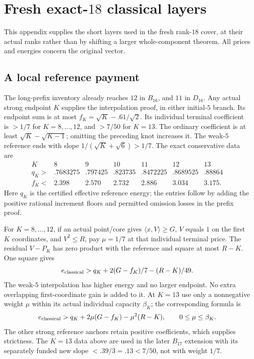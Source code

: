 \documentclass[11pt]{article}
\theoremstyle{definition}
\theoremstyle{remark}
\newcommand{\ip}[2]{\langle #1,#2\rangle}
\begin{document}
\section[Fresh exact-18 classical layers]{Fresh exact-\(18\) classical layers}
\label{app:exact18layers}
This appendix supplies the short layers used in the
fresh rank-\(18\) cover, at their actual ranks rather
than by shifting a larger whole-component theorem.
All prices and energies concern the original vector.

\subsection{A local reference payment}
The long-prefix inventory already reaches \(12\)
in \(B_{16}\), and \(11\) in \(D_{16}\).
Any actual strong endpoint \(K\) supplies the
interpolation proof, in either initial-\(5\) branch.
Its endpoint sum is at most
\(f_K=\sqrt K-.61/\sqrt2\).
Its individual terminal coefficient is \(>1/7\)
for \(K=8,\ldots,12\), and \(>7/50\) for \(K=13\).
The ordinary coefficient is at least
\(\sqrt K-\sqrt{K-1}\); omitting the preceding
knot increases it. The weak-\(5\) reference
ends with slope \(1/(\sqrt K+\sqrt6)>1/7\).
The exact conservative data are
\[
\begin{array}{c|rrrrrr}
K&8&9&10&11&12&13\\ \hline
q_K>&.7683275&.797425&.823735&.8472225&.8689525&.88864\\
f_K<&2.398&2.570&2.732&2.886&3.034&3.175.
\end{array}
\]
Here \(q_K\) is the certified effective reference
energy; the entries follow by adding the positive
rational increment floors and permitted omission
losses in the prefix proof.

For \(K=8,\ldots,12\), if an actual point/core gives
\(\ip{x}{V}\geq G\),
\(V\) equals \(1\) on the first \(K\) coordinates,
and \(V^2\leq R\), pay \(\mu=1/7\) at that
individual terminal price. The residual \(V-P_K\)
has zero product with the reference and square
at most \(R-K\). One square gives
\begin{equation}\label{app:eq:localpayment}
 e_{\rm classical}>
 q_K+2(G-f_K)/7-(R-K)/49.
\end{equation}
The weak-\(5\) interpolation has higher energy
and no larger endpoint. No extra overlapping
first-coordinate gain is added to it.
At \(K=13\) use only a nonnegative weight \(\mu\)
within its actual individual capacity \(\beta_K\); the corresponding
formula is
\[
 e_{\rm classical}>
 q_K+2\mu(G-f_K)-\mu^2(R-K),\qquad 0\leq\mu\leq\beta_K.
\]
The other strong reference anchors retain positive coefficients,
which supplies strictness. The \(K=13\) data above are used in
the later \(B_{17}\) extension with its separately funded new
slope \(<.39/3=.13<7/50\), not with weight \(1/7\).
\end{document}
